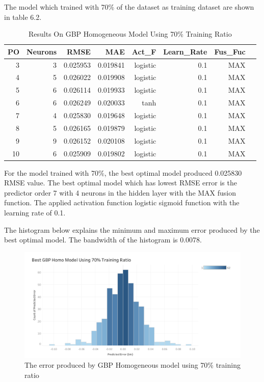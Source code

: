 {{{{{{{{{{{{{{{{{	
	
	The model which trained with 70\% of the dataset as training dataset are shown in table 6.2. 
	
	\setlength{\tabcolsep}{0.5em} %
	{\renewcommand{\arraystretch}{1.2}
		
		\begin{table}[ht]
			\centering
			\begin{tabular}{@{}rrrrrrrr@{}}
				\toprule
				\textbf{PO}&\textbf{Neurons}& \textbf{RMSE} & \textbf{MAE} & \textbf{Act\_F}  & \textbf{Learn\_Rate} &\textbf{ Fus\_Fuc}\\ 
				\midrule
				  3 & 3 & 0.025953 & 0.019841 & logistic & 0.1 & MAX \\ 
				  4 & 5 & 0.026022 & 0.019908 & logistic & 0.1 & MAX \\ 
				  5 & 6 & 0.026114 & 0.019933 & logistic & 0.1 & MAX \\ 
				  6 & 6 & 0.026249 & 0.020033 & tanh & 0.1 & MAX \\ 
				  7 & 4 & 0.025830 & 0.019648 & logistic & 0.1 & MAX \\ 
				  8 & 5 & 0.026165 & 0.019879 & logistic & 0.1 & MAX \\ 
				  9 & 9 & 0.026152 & 0.020108 & logistic & 0.1 & MAX \\ 
				  10 & 6 & 0.025909 & 0.019802 & logistic & 0.1 & MAX \\ 
				\hline 
				
			\end{tabular}
			\hspace*{1cm}
			\caption{Results On GBP Homogeneous Model Using 70\% Training Ratio }
		\end{table}
		
For the model trained with 70\%,  the best optimal model produced 0.025830 RMSE value. The best optimal model which has lowest RMSE error is the predictor order 7 with 4 neurons in the hidden layer with the MAX fusion function. The applied activation function logistic sigmoid function with the learning rate of 0.1.
		
The histogram below explains the minimum and maximum error produced by the best optimal model. The bandwidth of the histogram is 0.0078.
		
		\begin{figure}[hbt!]\centering
			\includegraphics[width=1\textwidth]{homo_gbp_70}
			\caption{The error produced by GBP Homogeneous model  using 70\% training ratio}
		\end{figure}
		
}}}}}}}}}}}}}}}}}}
